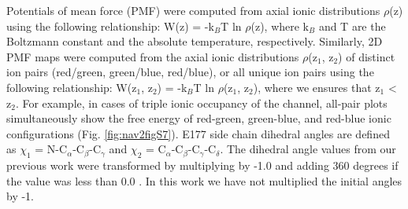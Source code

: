 \begin{refsection}
Potentials of mean force (PMF) were computed from axial ionic distributions $\rho$(z) using the following relationship: W(z) = -k$_B$T ln $\rho$(z), where k$_B$ and T are the Boltzmann constant and the absolute temperature, respectively. Similarly, 2D PMF maps were computed from the axial ionic distributions $\rho$(z$_1$, z$_2$) of distinct ion pairs (red/green, green/blue, red/blue), or all unique ion pairs using the following relationship: W(z$_1$, z$_2$) = -k$_B$T ln $\rho$(z$_1$, z$_2$), where we ensures that z$_1$ <  z$_2$. For example, in cases of triple ionic occupancy of the channel, all-pair plots simultaneously show the free energy of red-green, green-blue, and red-blue ionic configurations (Fig. \ref{fig:nav2figS7}).
E177 side chain dihedral angles are defined as $\chi_1$ = N-C$_{\alpha}$-C$_{\beta}$-C$_{\gamma}$ and $\chi_2$ = C$_{\alpha}$-C$_{\beta}$-C$_{\gamma}$-C$_{\delta}$. The dihedral angle values from our previous work were transformed by multiplying by -1.0 and adding 360 degrees if the value was less than 0.0 \cite{Chakrabarti:2013kd}. In this work we have not multiplied the initial angles by -1. 


\end{refsection}
